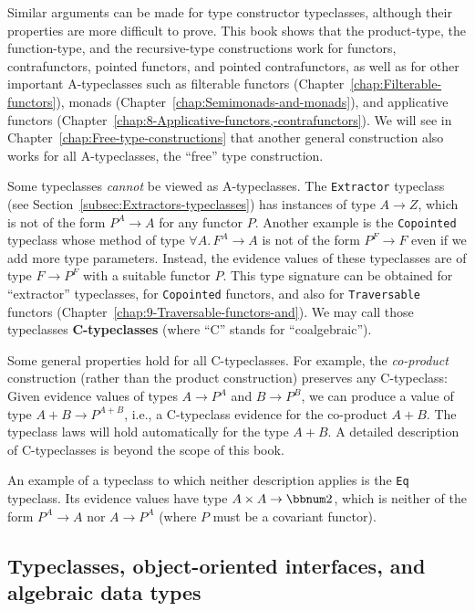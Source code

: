 Similar arguments can be made for type constructor typeclasses, although
their properties are more difficult to prove. This book shows that
the product-type, the function-type, and the recursive-type constructions
work for functors, contrafunctors, pointed functors, and pointed contrafunctors,
as well as for other important A-typeclasses such as filterable functors
(Chapter~\ref{chap:Filterable-functors}), monads (Chapter~\ref{chap:Semimonads-and-monads}),
and applicative functors (Chapter~\ref{chap:8-Applicative-functors,-contrafunctors}).
We will see in Chapter~\ref{chap:Free-type-constructions} that another
general construction also works for all A-typeclasses, \textemdash{}
the \textsf{``}free\textsf{''} type construction.

Some typeclasses \emph{cannot} be viewed as A-typeclasses. The \lstinline!Extractor!
typeclass (see Section~\ref{subsec:Extractors-typeclasses}) has
instances of type $A\rightarrow Z$, which is not of the form $P^{A}\rightarrow A$
for any functor $P$. Another example is the \lstinline!Copointed!
typeclass whose method of type $\forall A.\,F^{A}\rightarrow A$ is
not of the form $P^{F}\rightarrow F$ even if we add more type parameters.
Instead, the evidence values of these typeclasses are of type $F\rightarrow P^{F}$
with a suitable functor $P$. This type signature can be obtained
for \textsf{``}extractor\textsf{''} typeclasses, for \lstinline!Copointed! functors,
and also for \lstinline!Traversable! functors (Chapter~\ref{chap:9-Traversable-functors-and}).
We may call those typeclasses \textbf{C-typeclasses} (where \textsf{``}C\textsf{''}
stands for \textsf{``}coalgebraic\textsf{''}).

Some general properties hold for all C-typeclasses. For example, the
\emph{co-product} construction (rather than the product construction)
preserves any C-typeclass: Given evidence values of types $A\rightarrow P^{A}$
and $B\rightarrow P^{B}$, we can produce a value of type $A+B\rightarrow P^{A+B}$,
i.e., a C-typeclass evidence for the co-product $A+B$. The typeclass
laws will hold automatically for the type $A+B$. A detailed description
of C-typeclasses is beyond the scope of this book.

An example of a typeclass to which neither description applies is
the \lstinline!Eq! typeclass. Its evidence values have type $A\times A\rightarrow\bbnum 2$,
which is neither of the form $P^{A}\rightarrow A$ nor $A\rightarrow P^{A}$
(where $P$ must be a covariant functor).

\subsection{Typeclasses, object-oriented interfaces, and algebraic data types}

